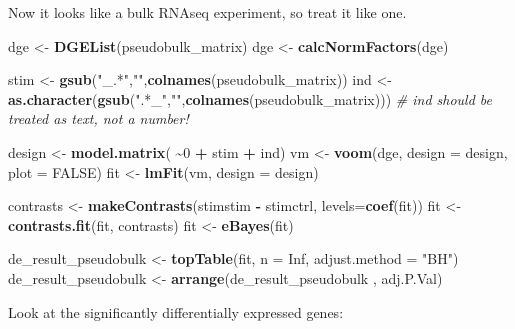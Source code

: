 \documentclass[
]{book}
\newenvironment{Shaded}{\begin{snugshade}}{\end{snugshade}}
\newcommand{\AttributeTok}[1]{\textcolor[rgb]{0.13,0.29,0.53}{#1}}
\newcommand{\CommentTok}[1]{\textcolor[rgb]{0.56,0.35,0.01}{\textit{#1}}}
\newcommand{\ConstantTok}[1]{\textcolor[rgb]{0.56,0.35,0.01}{#1}}
\newcommand{\DecValTok}[1]{\textcolor[rgb]{0.00,0.00,0.81}{#1}}
\newcommand{\FunctionTok}[1]{\textcolor[rgb]{0.13,0.29,0.53}{\textbf{#1}}}
\newcommand{\NormalTok}[1]{#1}
\newcommand{\OtherTok}[1]{\textcolor[rgb]{0.56,0.35,0.01}{#1}}
\newcommand{\SpecialCharTok}[1]{\textcolor[rgb]{0.81,0.36,0.00}{\textbf{#1}}}
\newcommand{\StringTok}[1]{\textcolor[rgb]{0.31,0.60,0.02}{#1}}
\begin{document}
Now it looks like a bulk RNAseq experiment, so treat it like one.

\begin{Shaded}
\begin{Highlighting}[]
\NormalTok{dge }\OtherTok{\textless{}{-}} \FunctionTok{DGEList}\NormalTok{(pseudobulk\_matrix)}
\NormalTok{dge }\OtherTok{\textless{}{-}} \FunctionTok{calcNormFactors}\NormalTok{(dge)}

\NormalTok{stim }\OtherTok{\textless{}{-}} \FunctionTok{gsub}\NormalTok{(}\StringTok{"\_.*"}\NormalTok{,}\StringTok{""}\NormalTok{,}\FunctionTok{colnames}\NormalTok{(pseudobulk\_matrix))}
\NormalTok{ind  }\OtherTok{\textless{}{-}} \FunctionTok{as.character}\NormalTok{(}\FunctionTok{gsub}\NormalTok{(}\StringTok{".*\_"}\NormalTok{,}\StringTok{""}\NormalTok{,}\FunctionTok{colnames}\NormalTok{(pseudobulk\_matrix))) }\CommentTok{\# ind should be treated as text, not a number!}

\NormalTok{design }\OtherTok{\textless{}{-}} \FunctionTok{model.matrix}\NormalTok{( }\SpecialCharTok{\textasciitilde{}}\DecValTok{0} \SpecialCharTok{+}\NormalTok{ stim }\SpecialCharTok{+}\NormalTok{ ind)}
\NormalTok{vm  }\OtherTok{\textless{}{-}} \FunctionTok{voom}\NormalTok{(dge, }\AttributeTok{design =}\NormalTok{ design, }\AttributeTok{plot =} \ConstantTok{FALSE}\NormalTok{)}
\NormalTok{fit }\OtherTok{\textless{}{-}} \FunctionTok{lmFit}\NormalTok{(vm, }\AttributeTok{design =}\NormalTok{ design)}

\NormalTok{contrasts }\OtherTok{\textless{}{-}} \FunctionTok{makeContrasts}\NormalTok{(stimstim }\SpecialCharTok{{-}}\NormalTok{ stimctrl, }\AttributeTok{levels=}\FunctionTok{coef}\NormalTok{(fit))}
\NormalTok{fit }\OtherTok{\textless{}{-}} \FunctionTok{contrasts.fit}\NormalTok{(fit, contrasts)}
\NormalTok{fit }\OtherTok{\textless{}{-}} \FunctionTok{eBayes}\NormalTok{(fit)}

\NormalTok{de\_result\_pseudobulk }\OtherTok{\textless{}{-}} \FunctionTok{topTable}\NormalTok{(fit, }\AttributeTok{n =} \ConstantTok{Inf}\NormalTok{, }\AttributeTok{adjust.method =} \StringTok{"BH"}\NormalTok{)}
\NormalTok{de\_result\_pseudobulk }\OtherTok{\textless{}{-}} \FunctionTok{arrange}\NormalTok{(de\_result\_pseudobulk , adj.P.Val)}
\end{Highlighting}
\end{Shaded}

Look at the significantly differentially expressed genes:
\end{document}
